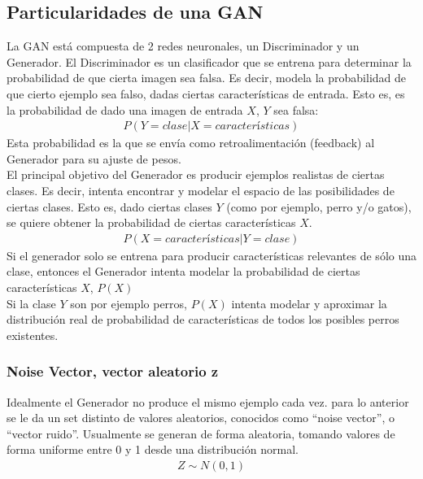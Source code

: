 \clearpage
\subsection{Particularidades de una GAN}
La GAN está compuesta de 2 redes neuronales, un Discriminador y un Generador.
El Discriminador es un clasificador que se entrena para determinar la probabilidad de que cierta imagen sea falsa. Es decir, modela la probabilidad de que cierto ejemplo sea falso, dadas ciertas características de entrada. Esto es, es la probabilidad de dado una imagen de entrada $X$, $Y$ sea falsa:
\begin{align}
 P(Y=clase | X=características)
\end{align}
 Esta probabilidad es la que se envía como retroalimentación (feedback) al Generador para su ajuste de pesos. \\

 El principal objetivo del Generador es producir ejemplos realistas de ciertas clases. Es decir, intenta encontrar y modelar el espacio de las posibilidades de ciertas clases. Esto es, dado ciertas clases $Y$ (como por ejemplo, perro y/o gatos), se quiere obtener la probabilidad de ciertas características $X$.
\begin{align}
    P(X= características | Y= clase )
\end{align}
Si el generador solo se entrena para producir características relevantes de sólo una clase, entonces el Generador intenta modelar la probabilidad de ciertas características $X$, $P(X)$\\
Si la clase $Y$ son por ejemplo perros, $P(X)$ intenta modelar y aproximar la distribución real de probabilidad de características de todos los posibles perros existentes.

\subsubsection{Noise Vector, vector aleatorio z}
Idealmente el Generador no produce el mismo ejemplo cada vez.
para lo anterior se le da un set distinto de valores aleatorios, conocidos como ``noise vector'', o ``vector ruido''.
Usualmente se generan de forma aleatoria, tomando valores de forma uniforme entre 0 y 1 desde una distribución normal.
\begin{align}
    Z \sim N(0,1)
\end{align}

